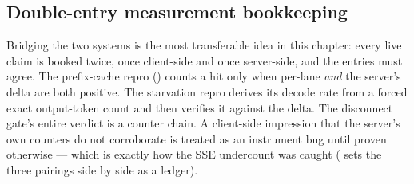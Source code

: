 \subsection{Double-entry measurement bookkeeping}

Bridging the two systems is the most transferable idea in this chapter:
every live claim is booked twice, once client-side and once server-side,
and the entries must agree. The prefix-cache repro () counts a hit only when
per-lane  \emph{and} the
server's  delta are both positive. The
starvation repro derives its decode rate from a forced exact output-token
count and then verifies it against the 
delta. The disconnect gate's entire verdict is a counter chain. A
client-side impression that the server's own counters do not corroborate is
treated as an instrument bug until proven otherwise --- which is exactly
how the SSE undercount was caught ( sets the
three pairings side by side as a ledger).

